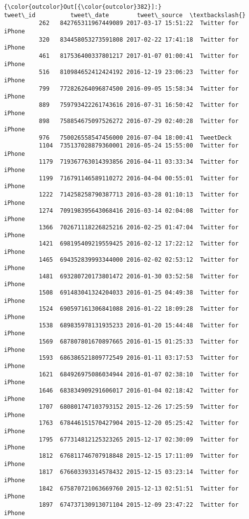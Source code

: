 \documentclass[11pt]{article}
\begin{document}
\begin{Verbatim}[commandchars=\\\{\}]
{\color{outcolor}Out[{\color{outcolor}382}]:}                 tweet\_id          tweet\_date        tweet\_source  \textbackslash{}
          262   842765311967449089 2017-03-17 15:51:22  Twitter for iPhone   
          320   834458053273591808 2017-02-22 17:41:18  Twitter for iPhone   
          461   817536400337801217 2017-01-07 01:00:41  Twitter for iPhone   
          516   810984652412424192 2016-12-19 23:06:23  Twitter for iPhone   
          799   772826264096874500 2016-09-05 15:58:34  Twitter for iPhone   
          889   759793422261743616 2016-07-31 16:50:42  Twitter for iPhone   
          898   758854675097526272 2016-07-29 02:40:28  Twitter for iPhone   
          976   750026558547456000 2016-07-04 18:00:41  TweetDeck            
          1104  735137028879360001 2016-05-24 15:55:00  Twitter for iPhone   
          1179  719367763014393856 2016-04-11 03:33:34  Twitter for iPhone   
          1199  716791146589110272 2016-04-04 00:55:01  Twitter for iPhone   
          1222  714258258790387713 2016-03-28 01:10:13  Twitter for iPhone   
          1274  709198395643068416 2016-03-14 02:04:08  Twitter for iPhone   
          1366  702671118226825216 2016-02-25 01:47:04  Twitter for iPhone   
          1421  698195409219559425 2016-02-12 17:22:12  Twitter for iPhone   
          1465  694352839993344000 2016-02-02 02:53:12  Twitter for iPhone   
          1481  693280720173801472 2016-01-30 03:52:58  Twitter for iPhone   
          1508  691483041324204033 2016-01-25 04:49:38  Twitter for iPhone   
          1524  690597161306841088 2016-01-22 18:09:28  Twitter for iPhone   
          1538  689835978131935233 2016-01-20 15:44:48  Twitter for iPhone   
          1569  687807801670897665 2016-01-15 01:25:33  Twitter for iPhone   
          1593  686386521809772549 2016-01-11 03:17:53  Twitter for iPhone   
          1621  684926975086034944 2016-01-07 02:38:10  Twitter for iPhone   
          1646  683834909291606017 2016-01-04 02:18:42  Twitter for iPhone   
          1707  680801747103793152 2015-12-26 17:25:59  Twitter for iPhone   
          1763  678446151570427904 2015-12-20 05:25:42  Twitter for iPhone   
          1795  677314812125323265 2015-12-17 02:30:09  Twitter for iPhone   
          1812  676811746707918848 2015-12-15 17:11:09  Twitter for iPhone   
          1817  676603393314578432 2015-12-15 03:23:14  Twitter for iPhone   
          1842  675870721063669760 2015-12-13 02:51:51  Twitter for iPhone   
          1897  674737130913071104 2015-12-09 23:47:22  Twitter for iPhone   

\end{Verbatim}
\end{document}
